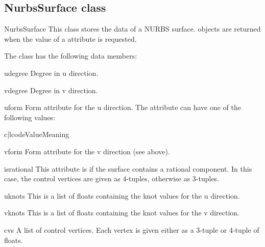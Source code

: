 \subsection{NurbsSurface class}
\label{nurbssurface}

\begin{classdesc*}{NurbsSurface}
This class stores the data of a NURBS surface.  objects
are returned when the value of a  attribute is requested.
\end{classdesc*}

The class has the following data members:

\begin{memberdesc}{udegree}
Degree in u direction.
\end{memberdesc}

\begin{memberdesc}{vdegree}
Degree in v direction.
\end{memberdesc}

\begin{memberdesc}{uform}
Form attribute for the u direction. The attribute can have one of the 
following values:

\begin{tableii}{c|l}{code}{Value}{Meaning}
\end{tableii}
\end{memberdesc}

\begin{memberdesc}{vform}
Form attribute for the v direction (see above).
\end{memberdesc}

\begin{memberdesc}{isrational}
This attribute is  if the surface contains a rational component.
In this case, the control vertices are given as 4-tuples, otherwise
as 3-tuples. 
\end{memberdesc}

\begin{memberdesc}{uknots}
This is a list of floats containing the knot values for the u direction.
\end{memberdesc}

\begin{memberdesc}{vknots}
This is a list of floats containing the knot values for the v direction.
\end{memberdesc}

\begin{memberdesc}{cvs}
A list of control vertices. Each vertex is given either as a 3-tuple or
4-tuple of floats.
\end{memberdesc}

